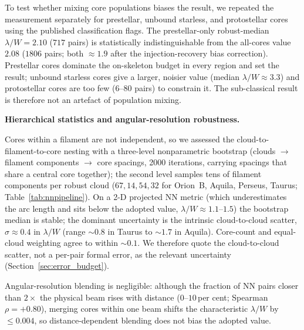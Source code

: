 \documentclass[usenatbib,twoside,twocolumn]{mnras}
\begin{document}
To test whether mixing core populations biases the result, we repeated the measurement separately for prestellar, unbound starless, and protostellar cores using the published classification flags. The prestellar-only robust-median $\lambda/W=2.10$ ($717$ pairs) is statistically indistinguishable from the all-cores value $2.08$ ($1806$ pairs; both $\approx1.9$ after the injection-recovery bias correction). Prestellar cores dominate the on-skeleton budget in every region and set the result; unbound starless cores give a larger, noisier value (median $\lambda/W\approx3.3$) and protostellar cores are too few ($6$--$80$ pairs) to constrain it. The sub-classical result is therefore not an artefact of population mixing.

\smallskip\noindent\textbf{Hierarchical statistics and angular-resolution robustness.}

Cores within a filament are not independent, so we assessed the cloud-to-filament-to-core nesting with a three-level nonparametric bootstrap (clouds $\to$ filament components $\to$ core spacings, 2000 iterations, carrying spacings that share a central core together); the second level samples tens of filament components per robust cloud ($67,14,54,32$ for Orion~B, Aquila, Perseus, Taurus; Table~\ref{tab:nnpipeline}). On a 2-D projected NN metric (which underestimates the arc length and sits below the adopted value, $\lambda/W\approx1.1$--$1.5$) the bootstrap median is stable; the dominant uncertainty is the intrinsic cloud-to-cloud scatter, $\sigma\approx0.4$ in $\lambda/W$ (range $\sim0.8$ in Taurus to $\sim1.7$ in Aquila). Core-count and equal-cloud weighting agree to within $\sim0.1$. We therefore quote the cloud-to-cloud scatter, not a per-pair formal error, as the relevant uncertainty (Section~\ref{sec:error_budget}).

Angular-resolution blending is negligible: although the fraction of NN pairs closer than $2\times$ the physical beam rises with distance ($0$--$10$\,per cent; Spearman $\rho=+0.80$), merging cores within one beam shifts the characteristic $\lambda/W$ by $\le0.004$, so distance-dependent blending does not bias the adopted value.
\end{document}
